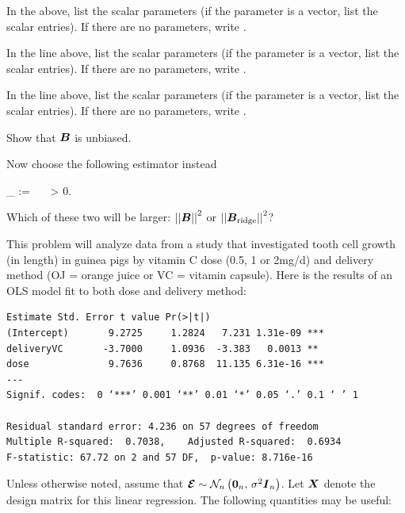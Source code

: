 \documentclass[12pt]{article}
\begin{document}
\begin{enumerate}[(a)]

 In the  above, list the scalar parameters (if the parameter is a vector, list the scalar entries). If there are no parameters, write . 

 In the  line above, list the scalar parameters (if the parameter is a vector, list the scalar entries). If there are no parameters, write . 

 In the  line above, list the scalar parameters (if the parameter is a vector, list the scalar entries). If there are no parameters, write . 

 Show that $\boldsymbol{B}$ is unbiased. 



\noindent Now choose the following estimator instead

\beqn
\B_{} :=  \Xt \Y ~~~\lambda > 0.
\eeqn


 Which of these two will be larger: $\left|\left|\boldsymbol{B}\right|\right|^2$ or $\left|\left|\boldsymbol{B}_{\text{ridge}}\right|\right|^2$? 


\end{enumerate}


\problem This problem will analyze data from a study that investigated tooth cell growth (in length) in guinea pigs by vitamin C dose (0.5, 1 or 2mg/d) and delivery method (OJ = orange juice or VC = vitamin capsule). Here is the results of an OLS model fit to both dose and delivery method:

\begin{Verbatim}[frame=single]
                Estimate Std. Error t value Pr(>|t|)    
(Intercept)       9.2725     1.2824   7.231 1.31e-09 ***
deliveryVC       -3.7000     1.0936  -3.383   0.0013 ** 
dose              9.7636     0.8768  11.135 6.31e-16 ***
---
Signif. codes:  0 ‘***’ 0.001 ‘**’ 0.01 ‘*’ 0.05 ‘.’ 0.1 ‘ ’ 1

Residual standard error: 4.236 on 57 degrees of freedom
Multiple R-squared:  0.7038,	Adjusted R-squared:  0.6934 
F-statistic: 67.72 on 2 and 57 DF,  p-value: 8.716e-16
\end{Verbatim}

\noindent Unless otherwise noted, assume that $\boldsymbol{\mathcal{E}} \sim \mathcal{N}_{n}\left(\boldsymbol{0}_n,\,\sigma^2 \boldsymbol{I}_n\right)$. 
Let $\boldsymbol{X}$ denote the design matrix for this linear regression. The following quantities may be useful:
\end{document}
